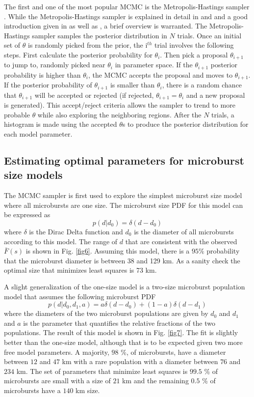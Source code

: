 \documentclass[draft]{agujournal2019}
\begin{document}
The first and one of the most popular MCMC is the Metropolis-Hastings sampler \cite{Metropolis1953, Hastings1970}. While the Metropolis-Hastings sampler is explained in detail in  and  and a good introduction given in  as well as , a brief overview is warranted. The Metropolis-Hastings sampler samples the posterior distribution in $N$ trials. Once an initial set of $\theta$ is randomly picked from the prior, the i$^{th}$ trial involves the following steps. First calculate the posterior probability for $\theta_i$. Then pick a proposal $\theta_{i+1}$ to jump to, randomly picked near $\theta_i$ in parameter space. If the $\theta_{i+1}$ posterior probability is higher than $\theta_i$, the MCMC accepts the proposal and moves to $\theta_{i+1}$. If the posterior probability of $\theta_{i+1}$ is smaller than $\theta_{i}$, there is a random chance that $\theta_{i+1}$ will be accepted or rejected (if rejected, $\theta_{i+1} = \theta_i$ and a new proposal is generated). This accept/reject criteria allows the sampler to trend to more probable $\theta$ while also exploring the neighboring regions. After the $N$ trials, a histogram is made using the accepted $\theta$s to produce the posterior distribution for each model parameter.


\subsection{Estimating optimal parameters for microburst size models}
The MCMC sampler is first used to explore the simplest microburst size model where all microbursts are one size. The microburst size PDF for this model can be expressed as
\begin{equation}
p(d | d_0) = \delta(d-d_0)
\end{equation} where $\delta$ is the Dirac Delta function and $d_0$ is the diameter of all microbursts according to this model. The range of $d$ that are consistent with the observed $\bar{F}(s)$ is shown in Fig. \ref{fig6}. Assuming this model, there is a $95 \%$ probability that the microburst diameter is between 38 and 129 km. As a sanity check the optimal size that minimizes least squares is 73 km.

A slight generalization of the one-size model is a two-size microburst population model that assumes the following microburst PDF
\begin{equation}
p(d | d_0, d_1, a) = a \delta(d-d_0) + (1-a)\delta(d-d_1)
\end{equation} where the diameters of the two microburst populations are given by $d_0$ and $d_1$ and $a$ is the parameter that quantifies the relative fractions of the two populations. The result of this model is shown in Fig. \ref{fig7}. The fit is slightly better than the one-size model, although that is to be expected given two more free model parameters. A majority, $98$ \%, of microbursts, have a diameter between $12$ and $47$ km with a rare population with a diameter between $76$ and $234$ km. The set of parameters that minimize least squares is $99.5$ \% of microbursts are small with a size of $21$ km and the remaining $0.5$ \% of microbursts have a $140$ km size.
\end{document}
